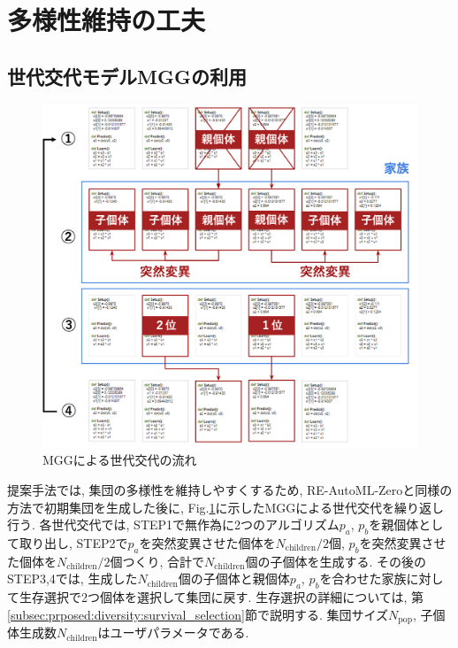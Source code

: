 \documentclass[11pt,oneside,openany,report]{jsbook}
\begin{document}
\section{多様性維持の工夫}\label{sec:proposed:diversity}

\subsection{世代交代モデルMGGの利用}

\begin{figure}[tbp]
  \centering
  \includegraphics[width=14cm]{mgg_automl_zero_vag/ag/mgg.png}
  \caption{MGGによる世代交代の流れ}
  \label{fig:mgg}
\end{figure}

提案手法では, 集団の多様性を維持しやすくするため, RE-AutoML-Zeroと同様の方法で初期集団を生成した後に, Fig.\ref{fig:mgg}に示したMGGによる世代交代を繰り返し行う. 各世代交代では, STEP1で無作為に2つのアルゴリズム$p_a$, $p_b$を親個体として取り出し, STEP2で$p_a$を突然変異させた個体を$N_\mathrm{children} / 2$個, $p_b$を突然変異させた個体を$N_\mathrm{children} / 2$個つくり, 合計で$N_\mathrm{children}$個の子個体を生成する. その後のSTEP3,4では, 生成した$N_\mathrm{children}$個の子個体と親個体$p_a$, $p_b$を合わせた家族に対して生存選択で2つ個体を選択して集団に戻す. 生存選択の詳細については, 第\ref{subsec:prposed:diversity:survival_selection}節で説明する. 集団サイズ$N_\mathrm{pop}$, 子個体生成数$N_\mathrm{children}$はユーザパラメータである.
\end{document}
